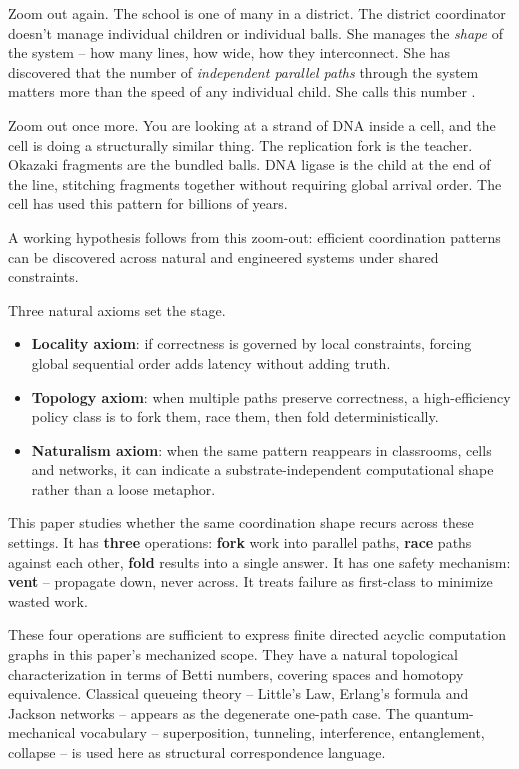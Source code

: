 \documentclass[
]{article}
\providecommand{\tightlist}{%
  \setlength{\itemsep}{0pt}\setlength{\parskip}{0pt}}
\begin{document}
Zoom out again. The school is one of many in a district. The district
coordinator doesn't manage individual children or individual balls. She
manages the \emph{shape} of the system -- how many lines, how wide, how
they interconnect. She has discovered that the number of
\emph{independent parallel paths} through the system matters more than
the speed of any individual child. She calls this number .

Zoom out once more. You are looking at a strand of DNA inside a cell,
and the cell is doing a structurally similar thing. The replication fork
is the teacher. Okazaki fragments are the bundled balls. DNA ligase is
the child at the end of the line, stitching fragments together without
requiring global arrival order. The cell has used this pattern for
billions of years.

A working hypothesis follows from this zoom-out: efficient coordination
patterns can be discovered across natural and engineered systems under
shared constraints.

Three natural axioms set the stage.

\begin{itemize}
\tightlist
\item
  \textbf{Locality axiom}: if correctness is governed by local
  constraints, forcing global sequential order adds latency without
  adding truth.\\
\item
  \textbf{Topology axiom}: when multiple paths preserve correctness, a
  high-efficiency policy class is to fork them, race them, then fold
  deterministically.\\
\item
  \textbf{Naturalism axiom}: when the same pattern reappears in
  classrooms, cells and networks, it can indicate a
  substrate-independent computational shape rather than a loose
  metaphor.
\end{itemize}

This paper studies whether the same coordination shape recurs across
these settings. It has \textbf{three} operations: \textbf{fork} work
into parallel paths, \textbf{race} paths against each other,
\textbf{fold} results into a single answer. It has one safety mechanism:
\textbf{vent} -- propagate down, never across. It treats failure as
first-class to minimize wasted work.

These four operations are sufficient to express finite directed acyclic
computation graphs in this paper's mechanized scope. They have a natural
topological characterization in terms of Betti numbers, covering spaces
and homotopy equivalence. Classical queueing theory -- Little's Law,
Erlang's formula and Jackson networks -- appears as the degenerate
one-path case. The quantum-mechanical vocabulary -- superposition,
tunneling, interference, entanglement, collapse -- is used here as
structural correspondence language.
\end{document}
